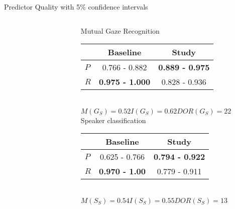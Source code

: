  \begin{frame}{Predictor Quality \tiny{with 5\% confidence intervals}}
    \begin{columns}[T] %
      \begin{column}{.5\textwidth}
     \begin{figure}[htb]
      \resizebox{\textwidth}{!}{%
        
      }
      \vspace{-70pt}
    \end{figure}
    \begin{figure}[htb]
      \resizebox{\textwidth}{!}{%
        
      }
    \end{figure}
    \end{column}%
      \begin{column}{.5\textwidth}
        \begin{center}
        \begin{scriptsize}
          Mutual Gaze Recognition
          \\ \vspace{10pt}
          \begin{tabular}{l | c | c }
                  & Baseline & Study \\ \hline
            \(P\) &  0.766 - 0.882&   \textbf{0.889 - 0.975} \\ 
            \(R\) &  \textbf{0.975 - 1.000} &  0.828 - 0.936 \\
           \end{tabular}
          \\ \vspace{10pt}
          \(M(G_S) = 0.52 \)\quad\(I(G_S) = 0.62\)\quad\( DOR(G_S) = 22\)
          \\ \vspace{10pt}
          Speaker classification
          \\ \vspace{10pt}
          \begin{tabular}{l | c | c }
                  & Baseline & Study \\ \hline
            \(P\) &  0.625 - 0.766 &   \textbf{0.794 - 0.922} \\ 
            \(R\) &  \textbf{0.970 - 1.00} &  0.779 - 0.911 \\
           \end{tabular}
          \\ \vspace{10pt}
          \(M(S_S) = 0.54 \)\quad\(I(S_S) = 0.55\)\quad\( DOR(S_S) = 13\)
          \end{scriptsize}
        \end{center}
   \end{column}%
   \end{columns}
  \end{frame}
